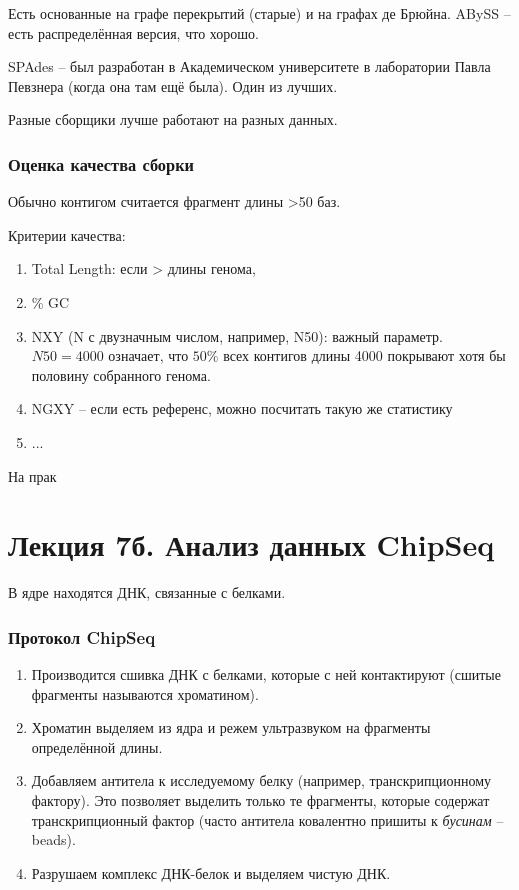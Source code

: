 \documentclass[main.tex]{subfiles}
\begin{document}
Есть основанные на графе перекрытий (старые) и на графах де Брюйна.
ABySS -- есть распределённая версия, что хорошо.

SPAdes -- был разработан в Академическом университете в лаборатории Павла Певзнера (когда она там ещё была).
Один из лучших.

Разные сборщики лучше работают на разных данных.

\subsubsection{Оценка качества сборки}

Обычно контигом считается фрагмент длины >50 баз.

Критерии качества:
\begin{enumerate}[noitemsep]
    \item Total Length: если > длины генома,
    \item \% GC
    \item NXY (N с двузначным числом, например, N50): важный параметр.
    $ N50 = 4000 $ означает, что $50\%$ всех контигов длины 4000 покрывают хотя бы половину собранного генома.
    \item NGXY -- если есть референс, можно посчитать такую же статистику
    \item ...
\end{enumerate}

На прак

\section{Лекция 7б. Анализ данных ChipSeq }

В ядре находятся ДНК, связанные с белками.
\subsubsection{Протокол ChipSeq}
\begin{enumerate}[noitemsep]
    \item Производится сшивка ДНК с белками, которые с ней контактируют (сшитые фрагменты называются хроматином).
    \item Хроматин выделяем из ядра и режем ультразвуком на фрагменты определённой длины.
    \item Добавляем антитела к исследуемому белку (например, транскрипционному фактору).
    Это позволяет выделить только те фрагменты, которые содержат транскрипционный фактор (часто антитела ковалентно пришиты к \emph{бусинам} -- beads).
    \item Разрушаем комплекс ДНК-белок и выделяем чистую ДНК.
\end{enumerate}
\end{document}
